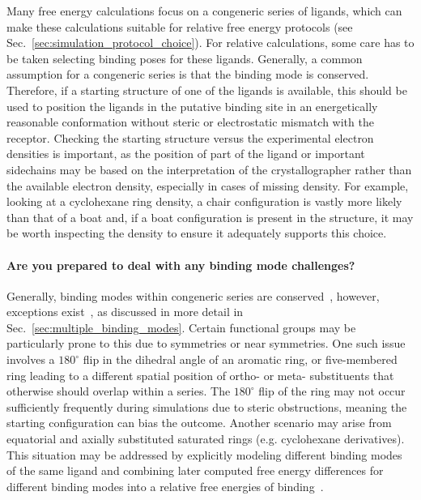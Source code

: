 \documentclass[9pt,bestpractices]{livecoms}
\begin{document}
Many free energy calculations focus on a congeneric series of ligands, which can make these calculations suitable for relative free energy protocols (see Sec.~\ref{sec:simulation_protocol_choice}). For relative calculations, some care has to be taken selecting binding poses for these ligands. Generally, a common assumption for a congeneric series is that the binding mode is conserved. Therefore, if a starting structure of one of the ligands is available, this should be used to position the ligands in the putative binding site in an energetically reasonable conformation without steric or electrostatic mismatch with the receptor. Checking the starting structure versus the experimental electron densities is important, as the position of part of the ligand or important sidechains may be based on the interpretation of the crystallographer rather than the available electron density, especially in cases of missing density. For example, looking at a cyclohexane ring density, a chair configuration is vastly more likely than that of a boat and, if a boat configuration is present in the structure, it may be worth inspecting the density to ensure it adequately supports this choice. 

\paragraph{Are you prepared to deal with any binding mode challenges?}
Generally, binding modes within congeneric series are conserved~\cite{wacker2010conserved}, however, exceptions exist~\cite{brandt2011congeneric,nazare2005probing}, as discussed in more detail in Sec.~\ref{sec:multiple_binding_modes}. Certain functional groups may be particularly prone to this due to symmetries or near symmetries. One such issue involves a $180^{\circ}$ flip in the dihedral angle of an aromatic ring, or five-membered ring leading to a different spatial position of ortho- or meta- substituents that otherwise should overlap within a series. The $180^{\circ}$ flip of the ring may not occur sufficiently frequently during simulations due to steric obstructions, meaning the  starting configuration can bias the outcome. Another scenario may arise from equatorial and axially substituted saturated rings (e.g. cyclohexane derivatives). This situation may be addressed by explicitly modeling different binding modes of the same ligand and combining later computed free energy differences for different binding modes into a relative free energies of binding~\cite{kaus2015how}.
\end{document}
